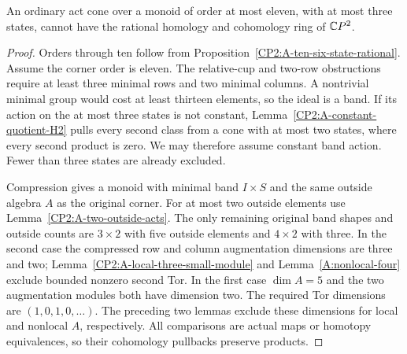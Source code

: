 \begin{proposition}
\label{CP2:A-eleven-three-state-rational}
An ordinary act cone over a monoid of order at most eleven,
with at most three states, cannot have the rational homology
and cohomology ring of $\mathbb{C}P^2$.
\end{proposition}
\begin{proof}
Orders through ten follow from
Proposition~\ref{CP2:A-ten-six-state-rational}.
Assume the corner order is eleven. The relative-cup and
two-row obstructions require at least three minimal rows
and two minimal columns. A nontrivial minimal group would
cost at least thirteen elements, so the ideal is a band.
If its action on the at most three states is not constant,
Lemma~\ref{CP2:A-constant-quotient-H2} pulls every second
class from a cone with at most two states, where every
second product is zero. We may therefore assume constant
band action. Fewer than three states are already excluded.

Compression gives a monoid with minimal band $I\times S$
and the same outside algebra $A$ as the original corner.
For at most two outside elements use
Lemma~\ref{CP2:A-two-outside-acts}. The only remaining
original band shapes and outside counts are
$3\times2$ with five outside elements and
$4\times2$ with three. In the second case the compressed
row and column augmentation dimensions are three and two;
Lemma~\ref{CP2:A-local-three-small-module} and
Lemma~\ref{A:nonlocal-four} exclude bounded nonzero
second Tor. In the first case $\dim A=5$ and the two
augmentation modules both have dimension two. The required
Tor dimensions are $(1,0,1,0,\ldots)$. The preceding two
lemmas exclude these dimensions for local and nonlocal
$A$, respectively. All comparisons are actual maps or
homotopy equivalences, so their cohomology pullbacks
preserve products.
\end{proof}

